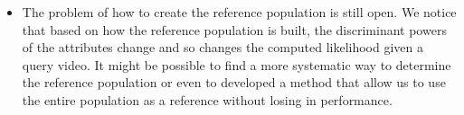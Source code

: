 \begin{itemize}
\item The problem of how to create the reference population is still open. We notice that based on how the reference population is built, the discriminant powers of the attributes change and so changes the computed likelihood given a query video.
It might be possible to find a more systematic way to determine the reference population or even to developed a method that allow us to use the entire population as a reference without losing in performance.

\end{itemize}

